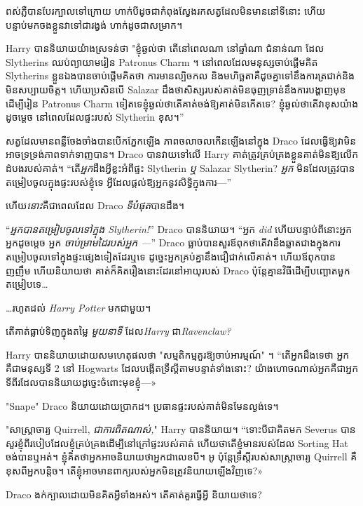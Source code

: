 {{ពស់ភ្លឺបានបែរក្បាលទៅក្រោយ ហាក់បីដូចជាកំពុងស្វែងរកសត្វដែលមិនមាននៅទីនោះ ហើយបន្ទាប់មកចងខ្លួនវាទៅជារង្វង់ ហាក់ដូចជាសម្រាក។

Harry បាននិយាយយ៉ាងស្រទន់ថា "ខ្ញុំឆ្ងល់ថា តើនៅពេលណា នៅឆ្នាំណា ជំនាន់ណា ដែល Slytherins ឈប់ព្យាយាមរៀន Patronus Charm ។ នៅពេលដែលមនុស្សចាប់ផ្តើមគិត Slytherins ខ្លួនឯងបានចាប់ផ្តើមគិតថា ការមានល្បិចកល និងមហិច្ឆតាគឺដូចគ្នាទៅនឹងការត្រជាក់និងមិនសប្បាយចិត្ត។ ហើយប្រសិនបើ Salazar ដឹងថាសិស្សរបស់គាត់មិនធុញទ្រាន់នឹងការបង្ហាញមុខដើម្បីរៀន Patronus Charm ទៀតទេខ្ញុំឆ្ងល់ថាតើគាត់ចង់ឱ្យគាត់មិនកើតទេ? ខ្ញុំឆ្ងល់ថាតើវាខុសយ៉ាងដូចម្តេច នៅពេលដែលផ្ទះរបស់ Slytherin ខុស។”

សត្វដែលមានពន្លឺចែងចាំងបានបើកភ្នែកឡើង ភាពចលាចលកើនឡើងនៅក្នុង Draco ដែលធ្វើឱ្យវាមិនអាចទ្រទ្រង់ភាពទាក់ទាញបាន។ Draco បាន​វាយ​ទៅលើ Harry គាត់​ត្រូវ​គ្រប់គ្រង​ខ្លួន​គាត់​មិន​ឱ្យ​លើក​ដំបង​របស់គាត់។ “តើ\emph{អ្នក}ដឹងអ្វីខ្លះអំពីផ្ទះ Slytherin \emph{ឬ} Salazar Slytherin? \emph{អ្នក} មិនដែលត្រូវបានតម្រៀបចូលក្នុងផ្ទះរបស់ខ្ញុំទេ អ្វីដែលផ្តល់ឱ្យអ្នកនូវសិទ្ធិក្នុងការ—”

ហើយ\emph{នោះ}គឺជាពេលដែល Draco \emph{ទីបំផុត}បានដឹង។

“\emph{អ្នកបានតម្រៀបចូលទៅក្នុង Slytherin!}” Draco បាននិយាយ។ “អ្នក \emph{did} ហើយបន្ទាប់ពីនោះអ្នក អ្នកដូចម្ដេច អ្នក \emph{ ចាប់ម្រាមដៃរបស់អ្នក —}” Draco ធ្លាប់បានសួរឪពុកថាតើវានឹងឆ្លាតជាងក្នុងការតម្រៀបចូលទៅក្នុងផ្ទះផ្សេងទៀតដែរឬទេ ដូច្នេះអ្នកគ្រប់គ្នានឹងជឿជាក់លើគាត់។ ហើយ​ឪពុក​បាន​ញញឹម ហើយ​និយាយ​ថា គាត់​ក៏​គិត​រឿង​នោះ​ដែរ​នៅ​អាយុ​របស់ Draco ប៉ុន្តែ​គ្មាន​វិធី​ដើម្បី​បញ្ឆោត​មួក​តម្រៀប​ទេ…

…រហូតដល់ \emph{Harry Potter} មកជាមួយ។

តើគាត់ធ្លាប់ទិញក្នុងតម្លៃ \emph{មួយនាទី} ដែល\emph{Harry} ជា\emph{Ravenclaw?}

Harry បាននិយាយដោយសមហេតុផលថា "សម្មតិកម្មគួរឱ្យចាប់អារម្មណ៍" ។ “តើអ្នកដឹងទេថា អ្នកគឺជាមនុស្សទី 2 នៅ Hogwarts ដែលបង្កើតទ្រឹស្ដីតាមបន្ទាត់ទាំងនោះ? យ៉ាង​ហោច​ណាស់​អ្នក​គឺ​ជា​អ្នក​ទី​ពីរ​ដែល​បាន​និយាយ​ដូច្នេះ​ចំពោះ​មុខ​ខ្ញុំ—»

"Snape" Draco និយាយដោយប្រាកដ។ ប្រធាន​ផ្ទះ​របស់​គាត់​មិន​មែន​ល្ងង់​ទេ។

"សាស្រ្តាចារ្យ Quirrell, \emph{ជាការពិតណាស់,}" Harry បាននិយាយ។ “ទោះបីជាគិតមក Severus បានសួរខ្ញុំពីរបៀបដែលខ្ញុំគ្រប់គ្រងដើម្បីនៅក្រៅផ្ទះរបស់គាត់ ហើយថាតើខ្ញុំមានរបស់ដែល Sorting Hat ចង់បានឬអត់។ ខ្ញុំគិតថាអ្នកអាចនិយាយថាអ្នកជាលេខបី។ អូ ប៉ុន្តែទ្រឹស្ដីរបស់សាស្រ្តាចារ្យ Quirrell គឺខុសពីអ្នកបន្តិច។ តើ​ខ្ញុំ​អាច​មាន​ពាក្យ​របស់​អ្នក​មិន​ត្រូវ​និយាយ​ឡើងវិញ​ទេ​?»

Draco ងក់ក្បាលដោយមិនគិតអ្វីទាំងអស់។ តើគាត់គួរធ្វើអ្វី និយាយថាទេ?

}}
